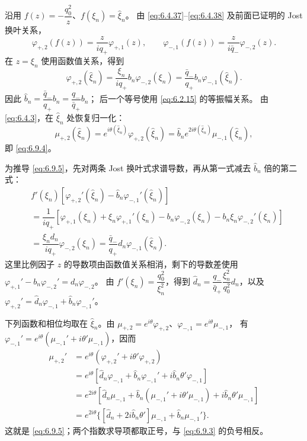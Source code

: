 \documentclass[lang=cn,scheme=chinese,mode=simple,device=normal,color=blue,
math=cm,thmcnt=section,12pt]{elegantbook}
\begin{document}
\begin{callout}[计算：(6.9.4)、(6.9.5) 的换叶推导]
    沿用 $f(z)=-\dfrac{q_0^2}{z}$、$f(\xi_n)=\widehat\xi_n$。
    由 \eqref{eq:6.4.37}--\eqref{eq:6.4.38} 及前面已证明的 Jost 换叶关系，
    \[
        \varphi_{+,2}(f(z))=\dfrac{z}{iq_+}\varphi_{+,1}(z),\qquad
        \varphi_{-,1}(f(z))=\dfrac{z}{i\bar q_-}\varphi_{-,2}(z).
    \]
    在 $z=\xi_n$ 使用函数值关系，得到
    \[
        \varphi_{+,2}(\widehat\xi_n)
        =\dfrac{\xi_n}{iq_+}b_n\varphi_{-,2}(\xi_n)
        =\dfrac{\bar q_-}{q_+}b_n\varphi_{-,1}(\widehat\xi_n).
    \]
    因此 $\widehat b_n=\dfrac{\bar q_-}{q_+}b_n=\dfrac{q_-}{\bar q_+}b_n$；
    后一个等号使用 \eqref{eq:6.2.15} 的等振幅关系。
    由 \eqref{eq:6.4.3}，在 $\widehat\xi_n$ 处恢复归一化：
    \[
        \mu_{+,2}(\widehat\xi_n)
        =e^{i\theta(\widehat\xi_n)}\varphi_{+,2}(\widehat\xi_n)
        =\widehat b_ne^{2i\theta(\widehat\xi_n)}\mu_{-,1}(\widehat\xi_n),
    \]
    即 \eqref{eq:6.9.4}。

    为推导 \eqref{eq:6.9.5}，先对两条 Jost 换叶式求谱导数，再从第一式减去
    $\widehat b_n$ 倍的第二式：
    \[
        \begin{aligned}
             & f'(\xi_n)[\varphi_{+,2}'(\widehat\xi_n)-\widehat b_n\varphi_{-,1}'(\widehat\xi_n)] \\
             & =\dfrac{1}{iq_+}[\varphi_{+,1}(\xi_n)+\xi_n\varphi_{+,1}'(\xi_n)
            -b_n\varphi_{-,2}(\xi_n)-b_n\xi_n\varphi_{-,2}'(\xi_n)]                               \\
             & =\dfrac{\xi_nd_n}{iq_+}\varphi_{-,2}(\xi_n)
            =\dfrac{\bar q_-}{q_+}d_n\varphi_{-,1}(\widehat\xi_n).
        \end{aligned}
    \]
    这里比例因子 $z$ 的导数项由函数值关系相消，剩下的导数差使用
    $\varphi_{+,1}'-b_n\varphi_{-,2}'=d_n\varphi_{-,2}$。
    由 $f'(\xi_n)=\dfrac{q_0^2}{\xi_n^2}$，得到
    $\widehat d_n=\dfrac{q_-}{\bar q_+}\dfrac{\xi_n^2}{q_0^2}d_n$，以及
    $\varphi_{+,2}'=\widehat d_n\varphi_{-,1}+\widehat b_n\varphi_{-,1}'$。

    下列函数和相位均取在 $\widehat\xi_n$。由
    $\mu_{+,2}=e^{i\theta}\varphi_{+,2}$、$\varphi_{-,1}=e^{i\theta}\mu_{-,1}$，
    有 $\varphi_{-,1}'=e^{i\theta}(\mu_{-,1}'+i\theta'\mu_{-,1})$，因而
    \[
        \begin{aligned}
            \mu_{+,2}'
             & =e^{i\theta}(\varphi_{+,2}'+i\theta'\varphi_{+,2})                                                   \\
             & =e^{i\theta}[\widehat d_n\varphi_{-,1}+\widehat b_n\varphi_{-,1}'+i\widehat b_n\theta'\varphi_{-,1}] \\
             & =e^{2i\theta}[\widehat d_n\mu_{-,1}+\widehat b_n(\mu_{-,1}'+i\theta'\mu_{-,1})
            +i\widehat b_n\theta'\mu_{-,1}]                                                                         \\
             & =e^{2i\theta}\{[\widehat d_n+2i\widehat b_n\theta']\mu_{-,1}+\widehat b_n\mu_{-,1}'\}.
        \end{aligned}
    \]
    这就是 \eqref{eq:6.9.5}；两个指数求导项都取正号，与 \eqref{eq:6.9.3} 的负号相反。
\end{callout}
\end{document}
